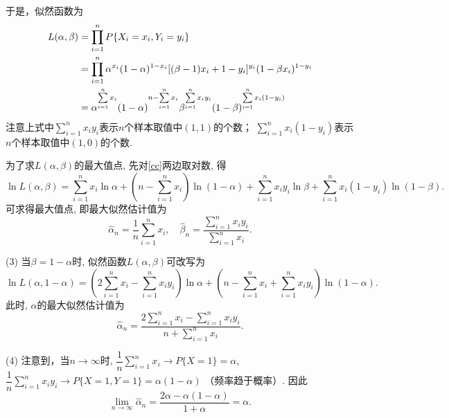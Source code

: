 于是，似然函数为
\begin{align}
L(\alpha,\beta)
&=\prod_{i=1}^n P\{X_i=x_i,Y_i=y_i\} \notag\\
&=\prod_{i=1}^n \alpha^{x_i}(1-\alpha)^{1-x_i}[(\beta-1)x_i+1-y_i]^{y_i}(1-\beta x_i)^{1-y_i} \notag\\
&= \alpha^{\sum\limits_{i=1}^n x_i}(1-\alpha)^{n-\sum\limits_{i=1}^n x_i}\beta^{\sum\limits_{i=1}^n x_iy_i}(1-\beta)^{\sum\limits_{i=1}^n x_i(1-y_i)} \label{cc}
\end{align}
%
注意上式中$\sum\limits_{i=1}^n x_iy_i$表示$n$个样本取值中$(1,1)$的个数；
$\sum\limits_{i=1}^n x_i(1-y_i)$表示$n$个样本取值中$(1,0)$的个数.

为了求$L(\alpha,\beta)$的最大值点, 先对\eqref{cc}两边取对数, 得
$$
\ln L(\alpha,\beta)=
{\sum\limits_{i=1}^n x_i}\ln\alpha
+(n-\sum\limits_{i=1}^n x_i)\ln(1-\alpha)
+{\sum\limits_{i=1}^n x_iy_i}\ln\beta
+{\sum\limits_{i=1}^n x_i(1-y_i)}\ln(1-\beta).
$$
可求得最大值点, 即最大似然估计值为
$$
\hat{\alpha}_n=\frac{1}{n}\sum\limits_{i=1}^n x_i,\quad
\hat{\beta}_n=\frac{\sum\limits_{i=1}^n x_iy_i}{\sum\limits_{i=1}^n x_i}.
$$

(3)
当$\beta=1-\alpha$时, 似然函数$L(\alpha,\beta)$可改写为
$$
\ln L(\alpha,1-\alpha)=
(2\sum\limits_{i=1}^n x_i-\sum\limits_{i=1}^n x_iy_i)\ln\alpha
+(n-\sum\limits_{i=1}^n x_i+\sum\limits_{i=1}^n x_iy_i)\ln(1-\alpha).
$$
此时, $\alpha$的最大似然估计值为
$$
\hat{\alpha}_n=\frac{2\sum\limits_{i=1}^n x_i-\sum\limits_{i=1}^n x_iy_i}{n+\sum\limits_{i=1}^n x_i}.
$$

(4) 注意到，当$n\to \infty$时, $\dfrac{1}{n}\sum\limits_{i=1}^n x_i\to P\{X=1\}=\alpha$,
$\dfrac{1}{n}\sum\limits_{i=1}^n x_iy_i\to P\{X=1,Y=1\}=\alpha(1-\alpha)$ （频率趋于概率）.
因此
$$
\lim_{n\to\infty}\hat{\alpha}_n=\frac{2\alpha-\alpha(1-\alpha)}{1+\alpha}=\alpha.
$$



